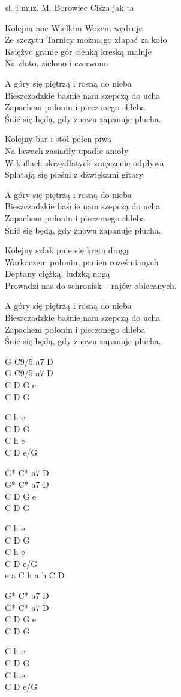 {sł. i muz. M. Borowiec}
{Cisza jak ta}
\begin{text}
Kolejna noc Wielkim Wozem wędruje\\
Ze szczytu Tarnicy można go złapać za koło\\
Księżyc granie gór cienką kreską maluje\\
Na złoto, zielono i czerwono

\vin A góry się piętrzą i rosną do nieba\\
\vin Bieszczadzkie baśnie nam szepczą do ucha\\
\vin Zapachem połonin i pieczonego chleba\\
\vin Śnić się będą, gdy znowu zapanuje plucha.

Kolejny bar i stół pełen piwa\\
Na ławach zasiadły upadłe anioły\\
W kuflach skrzydlatych zmęczenie odpływa\\
Splatają się pieśni z dźwiękami gitary

\vin A góry się piętrzą i rosną do nieba\\
\vin Bieszczadzkie baśnie nam szepczą do ucha\\
\vin Zapachem połonin i pieczonego chleba\\
\vin Śnić się będą, gdy znowu zapanuje plucha.

\hfill\break
Kolejny szlak pnie się krętą drogą\\
Warkoczem połonin, panien roześmianych\\
Deptany ciężką, ludzką nogą\\
Prowadzi nas do schronisk – rajów obiecanych.

\vin A góry się piętrzą i rosną do nieba\\
\vin Bieszczadzkie baśnie nam szepczą do ucha\\
\vin Zapachem połonin i pieczonego chleba\\
\vin Śnić się będą, gdy znowu zapanuje plucha.
\end{text}
\begin{chord}
G C9/5 a7 D\\
G C9/5 a7 D\\
C D G e\\
C D G

C h e\\
C D G\\
C h e\\
C D e/G

G* C* a7 D\\
G* C* a7 D\\
C D G e\\
C D G

C h e\\
C D G\\
C h e\\
C D e/G\\
\vin e a C h a h C D

G* C* a7 D\\
G* C* a7 D\\
C D G e\\
C D G

C h e\\
C D G\\
C h e\\
C D e/G
\end{chord}
